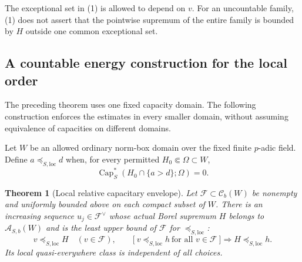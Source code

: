 \documentclass[11pt,a4paper]{article}
\numberwithin{equation}{section}
\newtheorem{theorem}{Theorem}[section]
\theoremstyle{definition}
\theoremstyle{remark}
\newcommand{\Cb}{\mathcal C_b}
\begin{document}
The exceptional set in (1) is allowed to depend on $v$.
For an uncountable family, (1) does not assert that the pointwise
supremum of the entire family is bounded by $H$ outside one
common exceptional set.

\subsection{A countable energy construction for the local order}

The preceding theorem uses one fixed capacity domain. The
following construction enforces the estimates in every smaller
domain, without assuming equivalence of capacities on different
domains.

Let $W$ be an allowed ordinary norm-box domain over the fixed
finite $p$-adic field. Define $a\preceq_{S,\mathrm{loc}}d$ when,
for every permitted $H_0\Subset\Omega\subset W$,
\[
 \operatorname{Cap}_S^*(H_0\cap\{a>d\};\Omega)=0.
\]

\begin{theorem}[Local relative capacitary envelope]
\label{thm:r2-local-capacitary-envelope}
Let $\mathcal F\subset\Cb(W)$ be nonempty and uniformly bounded
above on each compact subset of $W$. There is an increasing sequence
$u_j\in\mathcal F^\vee$ whose actual Borel supremum $H$ belongs
to $\mathcal A_{S,b}(W)$ and is the least upper bound of
$\mathcal F$ for $\preceq_{S,\mathrm{loc}}$:
\[
 v\preceq_{S,\mathrm{loc}}H\quad(v\in\mathcal F),
 \qquad
 \bigl[\ v\preceq_{S,\mathrm{loc}}h\ \text{for all }v\in\mathcal F\ \bigr]
 \Longrightarrow H\preceq_{S,\mathrm{loc}}h.
\]
Its local quasi-everywhere class is independent of all choices.
\end{theorem}
\end{document}
